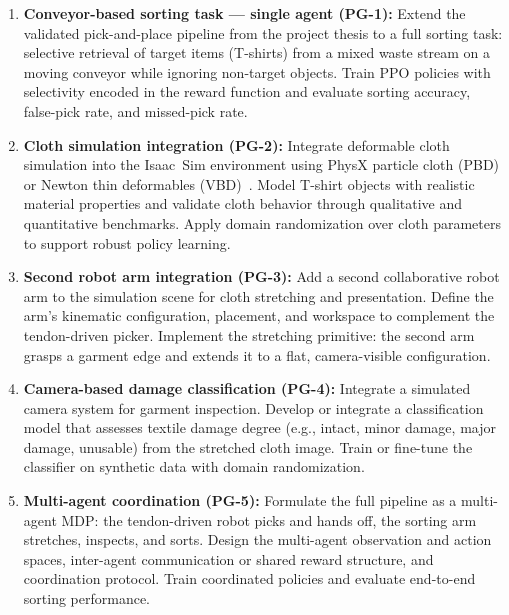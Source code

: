 \begin{enumerate}
  \item \textbf{Conveyor-based sorting task --- single agent (PG-1):}
  Extend the validated pick-and-place pipeline from the project thesis to a full sorting task: selective retrieval of target items (T-shirts) from a mixed waste stream on a moving conveyor while ignoring non-target objects. Train \ac{PPO} policies with selectivity encoded in the reward function and evaluate sorting accuracy, false-pick rate, and missed-pick rate.

  \item \textbf{Cloth simulation integration (PG-2):}
  Integrate deformable cloth simulation into the Isaac~Sim environment using PhysX particle cloth (\ac{PBD}) or Newton thin deformables (\ac{VBD})~\cite{muller2007pbd,Chen2024VBD}. Model T-shirt objects with realistic material properties and validate cloth behavior through qualitative and quantitative benchmarks. Apply domain randomization over cloth parameters to support robust policy learning.

  \item \textbf{Second robot arm integration (PG-3):}
  Add a second collaborative robot arm to the simulation scene for cloth stretching and presentation. Define the arm's kinematic configuration, placement, and workspace to complement the tendon-driven picker. Implement the stretching primitive: the second arm grasps a garment edge and extends it to a flat, camera-visible configuration.

  \item \textbf{Camera-based damage classification (PG-4):}
  Integrate a simulated camera system for garment inspection. Develop or integrate a classification model that assesses textile damage degree (e.g., intact, minor damage, major damage, unusable) from the stretched cloth image. Train or fine-tune the classifier on synthetic data with domain randomization.

  \item \textbf{Multi-agent coordination (PG-5):}
  Formulate the full pipeline as a multi-agent \ac{MDP}: the tendon-driven robot picks and hands off, the sorting arm stretches, inspects, and sorts. Design the multi-agent observation and action spaces, inter-agent communication or shared reward structure, and coordination protocol. Train coordinated policies and evaluate end-to-end sorting performance.


\end{enumerate}
